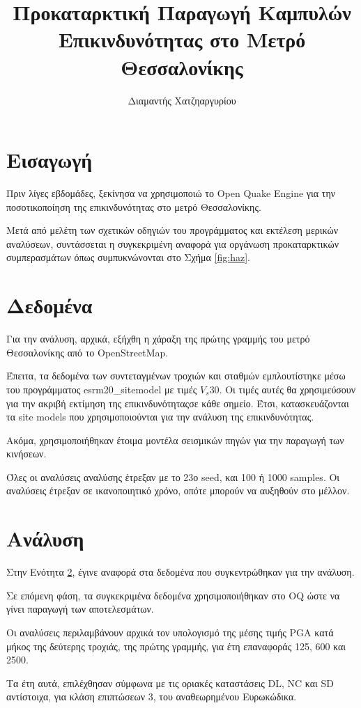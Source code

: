 \documentclass{report}
\title{Προκαταρκτική Παραγωγή Καμπυλών Επικινδυνότητας στο Μετρό Θεσσαλονίκης}
\author{Διαμαντής Χατζηαργυρίου}
\date{\Today}
\begin{document}
\maketitle

\section{Εισαγωγή}

Πριν λίγες εβδομάδες, ξεκίνησα να χρησιμοποιώ το Open Quake Engine για την ποσοτικοποίηση της επικινδυνότητας στο μετρό Θεσσαλονίκης.

Μετά από μελέτη των σχετικών οδηγιών του προγράμματος και εκτέλεση μερικών αναλύσεων, συντάσσεται η συγκεκριμένη αναφορά για οργάνωση προκαταρκτικών συμπερασμάτων όπως συμπυκνώνονται στο Σχήμα \ref{fig:haz}.

\section{Δεδομένα}
\label{data}
Για την ανάλυση, αρχικά, εξήχθη η χάραξη της πρώτης γραμμής του μετρό Θεσσαλονίκης από το OpenStreetMap.

Έπειτα, τα δεδομένα των συντεταγμένων τροχιών και σταθμών εμπλουτίστηκε μέσω του προγράμματος esrm20\_sitemodel με τιμές $V_s{30}$. Οι τιμές αυτές θα χρησιμεύσουν για την ακριβή εκτίμηση της επικινδυνότηταςσε κάθε σημείο. Έτσι, κατασκευάζονται τα site models που χρησιμοποιούνται για την ανάλυση της επικινδυνότητας.

Ακόμα, χρησιμοποιήθηκαν έτοιμα μοντέλα σεισμικών πηγών για την παραγωγή των κινήσεων.

Όλες οι αναλύσεις αναλύσης έτρεξαν με το 23ο seed, και 100 ή 1000 samples. Οι αναλύσεις έτρεξαν σε ικανοποιητικό χρόνο, οπότε μπορούν να αυξηθούν στο μέλλον.

\section{Ανάλυση}
Στην Ενότητα \ref{data}, έγινε αναφορά στα δεδομένα που συγκεντρώθηκαν για την ανάλυση.

Σε επόμενη φάση, τα συγκεκριμένα δεδομένα χρησιμοποιήθηκαν στο OQ ώστε να γίνει παραγωγή των αποτελεσμάτων.

Οι αναλύσεις περιλαμβάνουν αρχικά τον υπολογισμό της μέσης τιμής PGA κατά μήκος της δεύτερης τροχιάς, της πρώτης γραμμής, για έτη επαναφοράς 125, 600 και 2500. 

Τα έτη αυτά, επιλέχθησαν σύμφωνα με τις οριακές καταστάσεις DL, NC και SD αντίστοιχα, για κλάση επιπτώσεων 3, του αναθεωρημένου Ευρωκώδικα.
\end{document}
